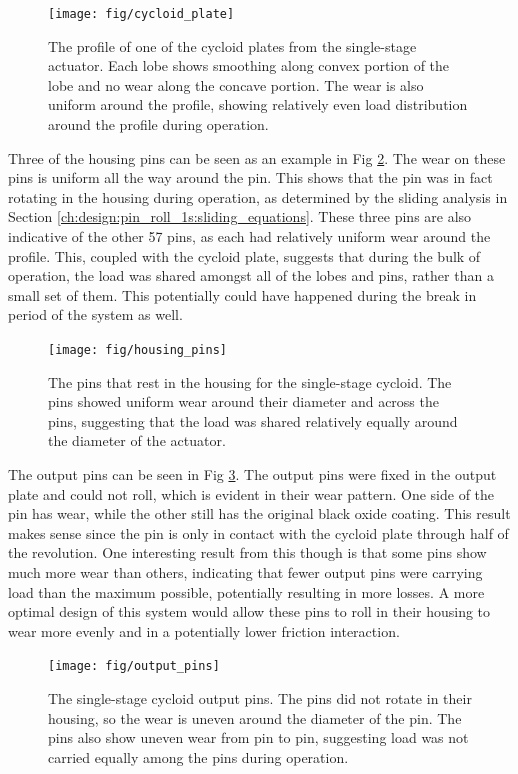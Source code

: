 \begin{figure}[!b]
   \centering
   \texttt{[image: fig/cycloid\_plate]}
   \caption{The profile of one of the cycloid plates from the single-stage actuator. Each lobe shows smoothing along convex portion of the lobe and no wear along the concave portion. The wear is also uniform around the profile, showing relatively even load distribution around the profile during operation.}
   \label{fig:cycloid_plate}
\end{figure}


Three of the housing pins can be seen as an example in Fig \ref{fig:single_housing_pins}. The wear on these pins is uniform all the way around the pin. This shows that the pin was in fact rotating in the housing during operation, as determined by the sliding analysis in Section \ref{ch:design:pin_roll_1s:sliding_equations}. These three pins are also indicative of the other 57 pins, as each had relatively uniform wear around the profile. This, coupled with the cycloid plate, suggests that during the bulk of operation, the load was shared amongst all of the lobes and pins, rather than a small set of them. This potentially could have happened during the break in period of the system as well. 

\begin{figure}[t]
   \centering
   \texttt{[image: fig/housing\_pins]}
   \caption{The pins that rest in the housing for the single-stage cycloid. The pins showed uniform wear around their diameter and across the pins, suggesting that the load was shared relatively equally around the diameter of the actuator.}
   \label{fig:single_housing_pins}
\end{figure}


The output pins can be seen in Fig \ref{fig:single_output_pins}. The output pins were fixed in the output plate and could not roll, which is evident in their wear pattern. One side of the pin has wear, while the other still has the original black oxide coating. This result makes sense since the pin is only in contact with the cycloid plate through half of the revolution. One interesting result from this though is that some pins show much more wear than others, indicating that fewer output pins were carrying load than the maximum possible, potentially resulting in more losses. A more optimal design of this system would allow these pins to roll in their housing to wear more evenly and in a potentially lower friction interaction. 

\begin{figure}[!b]
   \centering
   \texttt{[image: fig/output\_pins]}
   \caption{The single-stage cycloid output pins. The pins did not rotate in their housing, so the wear is uneven around the diameter of the pin. The pins also show uneven wear from pin to pin, suggesting load was not carried equally among the pins during operation.}
   \label{fig:single_output_pins}
\end{figure}

